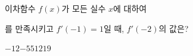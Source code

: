 이차함수 $f(x)$가 모든 실수 $x$에 대하여 \par\smallskip{}\par\smallskip\noindent 를 만족시키고 $f'(-1)=1$일 때, $f'(-2)$의 값은?
\begin{choices32}{$-12$}{$-5$}{$5$}{$12$}{$19$}\end{choices32}
